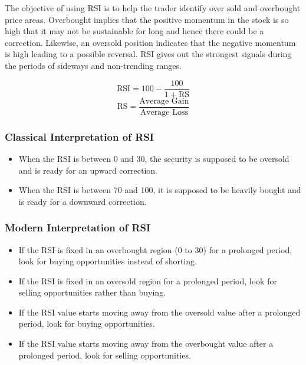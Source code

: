 The objective of using RSI is to help the trader identify over sold and overbought price areas. Overbought implies that the positive momentum in the stock is so high that it may not be sustainable for long and hence there could be a correction. Likewise, an oversold position indicates that the negative momentum is high leading to a possible reversal.
RSI gives out the strongest signals during the periods of sideways and non-trending ranges.

\[
  \textrm{RSI} = 100 - \frac{100}{1 + \textrm{RS}}
\]
\[
  \textrm{RS} = \frac{\textrm{Average Gain}}{\textrm{Average Loss}}
\]


\subsubsection{Classical Interpretation of RSI}
\begin{itemize}
  \item When the RSI is between 0 and 30, the security is supposed to be oversold and is ready for an upward correction.
  \item When the RSI is between 70 and 100, it is supposed to be heavily bought and is ready for a downward correction.
\end{itemize}

\subsubsection{Modern Interpretation of RSI}
\begin{itemize}
  \item If the RSI is fixed in an overbought region (0 to 30) for a prolonged period, look for buying opportunities instead of shorting.
  \item If the RSI is fixed in an oversold region for a prolonged period, look for selling opportunities rather than buying.
  \item If the RSI value starts moving away from the oversold value after a prolonged period, look for buying opportunities.
  \item If the RSI value starts moving away from the overbought value after a prolonged period, look for selling opportunities.
\end{itemize}

